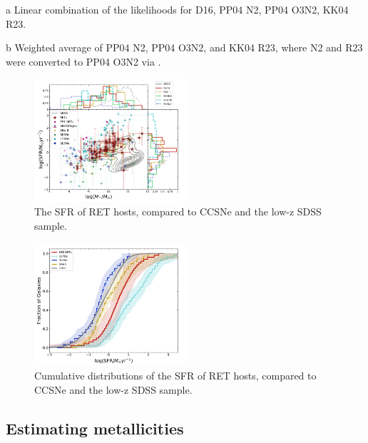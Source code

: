 \documentclass[fleqn,usenatbib,]{mnras}
\begin{document}
\begin{table}
\begin{threeparttable}
\begin{tabular}{lrrrllllll}
\bottomrule
\end{tabular}
\begin{tablenotes}
\item[a] Linear combination of the likelihoods for D16, PP04 N2, PP04 O3N2, KK04 R23.
\item[b] Weighted average of PP04 N2, PP04 O3N2, and KK04 R23, where N2 and R23 were converted to PP04 O3N2 via \citet{Kewley2008}.

\end{tablenotes}
\end{threeparttable}
\label{tab:derived}
\end{table}


\begin{figure}
\includegraphics[width=0.5\textwidth]{figs/SFR_Mike.png}
\caption{The SFR of RET hosts, compared to CCSNe and the low-z SDSS sample.
\label{fig:sfms_sfr}}
\end{figure}

\begin{figure}
\includegraphics[width=0.5\textwidth]{figs/cum_SFR_mike.png}
\caption{Cumulative distributions of the SFR of RET hosts, compared to CCSNe and the low-z SDSS sample.
\label{fig:sfr_cum}}
\end{figure}
\subsection{Estimating metallicities \label{subsec:calc_Z}}
\end{document}
